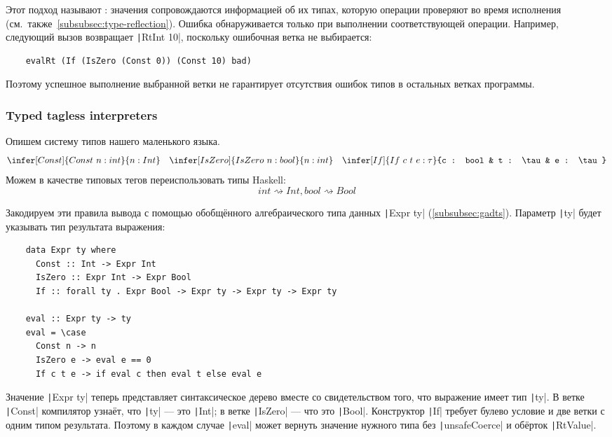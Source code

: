 Этот подход называют : значения сопровождаются информацией об их типах, которую операции проверяют во время исполнения (см.\ также\ \ref{subsubsec:type-reflection}).
Ошибка обнаруживается только при выполнении соответствующей операции.
Например, следующий вызов возвращает \texttt|RtInt 10|, поскольку ошибочная ветка не выбирается:
\begin{verbatim}
    evalRt (If (IsZero (Const 0)) (Const 10) bad)
\end{verbatim}
Поэтому успешное выполнение выбранной ветки не гарантирует отсутствия ошибок типов в остальных ветках программы.

\subsubsection{Typed tagless interpreters} \label{subsubsec:typed-tagless-initial}

Опишем систему типов нашего маленького языка.
\begin{equation*}{}
    \infer[Const]{Const~n : int}{n : Int}
    \quad
    \infer[IsZero]{IsZero~n : bool}{n : int}
    \quad
    \infer[If]{If~c~t~e : \tau}{c : bool & t : \tau & e : \tau}
\end{equation*}
Можем в качестве типовых тегов переиспользовать типы Haskell: \[int \rightsquigarrow Int, bool \rightsquigarrow Bool\]

Закодируем эти правила вывода с помощью обобщённого алгебраического типа данных \texttt|Expr ty| (\ref{subsubsec:gadts}).
Параметр \texttt|ty| будет указывать тип результата выражения:
\begin{verbatim}
    data Expr ty where
      Const :: Int -> Expr Int
      IsZero :: Expr Int -> Expr Bool
      If :: forall ty . Expr Bool -> Expr ty -> Expr ty -> Expr ty

    eval :: Expr ty -> ty
    eval = \case
      Const n -> n
      IsZero e -> eval e == 0
      If c t e -> if eval c then eval t else eval e
\end{verbatim}

Значение \texttt|Expr ty| теперь представляет синтаксическое дерево вместе со свидетельством того, что выражение имеет тип \texttt|ty|.
В ветке \texttt|Const| компилятор узнаёт, что \texttt|ty| --- это \texttt|Int|; в ветке \texttt|IsZero| --- что это \texttt|Bool|.
Конструктор \texttt|If| требует булево условие и две ветки с одним типом результата.
Поэтому в каждом случае \texttt|eval| может вернуть значение нужного типа без \texttt|unsafeCoerce| и обёрток \texttt|RtValue|.

